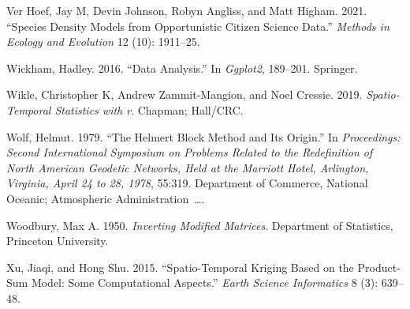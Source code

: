 \documentclass[smallextended]{svjour3}       %
\newlength{\cslhangindent}
\newlength{\cslentryspacingunit} %
\newenvironment{CSLReferences}[2] %
 {%
  \setlength{\parindent}{0pt}
  \ifodd #1
  \let\oldpar\par
  \def\par{\hangindent=\cslhangindent\oldpar}
  \fi
  \setlength{\parskip}{#2\cslentryspacingunit}
 }%
 {}
\begin{document}
\begin{CSLReferences}{1}{0}
\leavevmode{}%
Ver Hoef, Jay M, Devin Johnson, Robyn Angliss, and Matt Higham. 2021.
{``Species Density Models from Opportunistic Citizen Science Data.''}
\emph{Methods in Ecology and Evolution} 12 (10): 1911--25.

\leavevmode{}%
Wickham, Hadley. 2016. {``Data Analysis.''} In \emph{Ggplot2}, 189--201.
Springer.

\leavevmode{}%
Wikle, Christopher K, Andrew Zammit-Mangion, and Noel Cressie. 2019.
\emph{Spatio-Temporal Statistics with r}. Chapman; Hall/CRC.

\leavevmode{}%
Wolf, Helmut. 1979. {``The Helmert Block Method and Its Origin.''} In
\emph{Proceedings: Second International Symposium on Problems Related to
the Redefinition of North American Geodetic Networks, Held at the
Marriott Hotel, Arlington, Virginia, April 24 to 28, 1978}, 55:319.
Department of Commerce, National Oceanic; Atmospheric
Administration~\ldots.

\leavevmode{}%
Woodbury, Max A. 1950. \emph{Inverting Modified Matrices}. Department of
Statistics, Princeton University.

\leavevmode{}%
Xu, Jiaqi, and Hong Shu. 2015. {``Spatio-Temporal Kriging Based on the
Product-Sum Model: Some Computational Aspects.''} \emph{Earth Science
Informatics} 8 (3): 639--48.

\end{CSLReferences}




\end{document}
